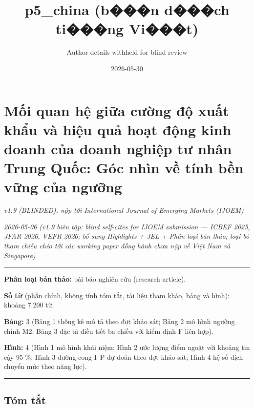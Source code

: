 \documentclass[12pt,a4paper]{article}
\title{p5\_china (b���n d���ch ti���ng Vi���t)}
\author{Author details withheld for blind review}
\date{2026-05-30}
\begin{document}
\maketitle

\hypertarget{mux1ed1i-quan-hux1ec7-giux1eefa-cux1b0ux1eddng-ux111ux1ed9-xuux1ea5t-khux1ea9u-vuxe0-hiux1ec7u-quux1ea3-houx1ea1t-ux111ux1ed9ng-kinh-doanh-cux1ee7a-doanh-nghiux1ec7p-tux1b0-nhuxe2n-trung-quux1ed1c-guxf3c-nhuxecn-vux1ec1-tuxednh-bux1ec1n-vux1eefng-cux1ee7a-ngux1b0ux1ee1ng}{%
\section{Mối quan hệ giữa cường độ xuất khẩu và hiệu quả hoạt động kinh
doanh của doanh nghiệp tư nhân Trung Quốc: Góc nhìn về tính bền vững của
ngưỡng}\label{mux1ed1i-quan-hux1ec7-giux1eefa-cux1b0ux1eddng-ux111ux1ed9-xuux1ea5t-khux1ea9u-vuxe0-hiux1ec7u-quux1ea3-houx1ea1t-ux111ux1ed9ng-kinh-doanh-cux1ee7a-doanh-nghiux1ec7p-tux1b0-nhuxe2n-trung-quux1ed1c-guxf3c-nhuxecn-vux1ec1-tuxednh-bux1ec1n-vux1eefng-cux1ee7a-ngux1b0ux1ee1ng}}

\emph{v1.9 (BLINDED), nộp tới International Journal of Emerging Markets
(IJOEM)}

\emph{2026-05-06 (v1.9 biên tập: blind self-cites for IJOEM submission
--- ICBEF 2025, JFAR 2026, VEFR 2026; bổ sung Highlights + JEL + Phân
loại bản thảo; loại bỏ tham chiếu chéo tới các working paper đồng hành
chưa nộp về Việt Nam và Singapore)}

\begin{center}\rule{0.5\linewidth}{0.5pt}\end{center}

\textbf{Phân loại bản thảo:} bài báo nghiên cứu (research article).

\textbf{Số từ} (phần chính, không tính tóm tắt, tài liệu tham khảo, bảng
và hình): khoảng 7.200 từ.

\textbf{Bảng:} 3 (Bảng 1 thống kê mô tả theo đợt khảo sát; Bảng 2 mô
hình ngưỡng chính M2; Bảng 3 đặc tả điều tiết ba chiều với kiểm định F
liên hợp).

\textbf{Hình:} 4 (Hình 1 mô hình khái niệm; Hình 2 ước lượng điểm ngoặt
với khoảng tin cậy 95 \%; Hình 3 đường cong I--P dự đoán theo đợt khảo
sát; Hình 4 hệ số dịch chuyển mức theo năng lực).

\begin{center}\rule{0.5\linewidth}{0.5pt}\end{center}

\hypertarget{tuxf3m-tux1eaft}{%
\subsection{Tóm tắt}\label{tuxf3m-tux1eaft}}
\end{document}
